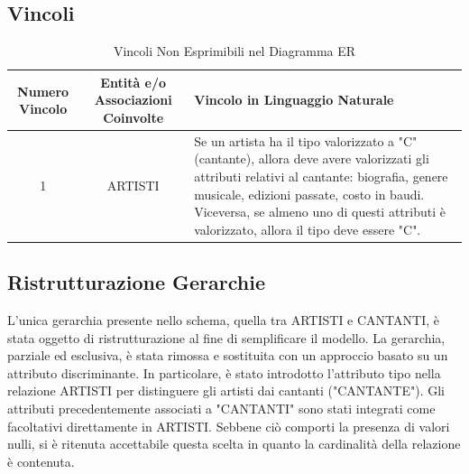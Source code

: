 \documentclass[a4paper,12pt]{article}
\begin{document}
\subsection{Vincoli}
\begin{table}[h!]
	\centering
	\begin{tabular}{|c|c|p{6.5cm}|}
		\hline
		\textbf{Numero Vincolo} & \textbf{Entità e/o Associazioni Coinvolte} & \textbf{Vincolo in Linguaggio Naturale} \\ \hline
		1 & ARTISTI & Se un artista ha il tipo valorizzato a "C" (cantante), allora deve avere valorizzati gli attributi relativi al cantante: biografia, genere musicale, edizioni passate, costo in baudi. Viceversa, se almeno uno di questi attributi è valorizzato, allora il tipo deve essere "C".\\ \hline
	\end{tabular}
	\caption{Vincoli Non Esprimibili nel Diagramma ER}
\end{table}

\subsection{Ristrutturazione Gerarchie}
L’unica gerarchia presente nello schema, quella tra ARTISTI e CANTANTI, è stata oggetto di ristrutturazione al fine di semplificare il modello. La gerarchia, parziale ed esclusiva, è stata rimossa e sostituita con un approccio basato su un attributo discriminante. In particolare, è stato introdotto l’attributo tipo nella relazione ARTISTI per distinguere gli artisti dai cantanti ("CANTANTE"). Gli attributi precedentemente associati a "CANTANTI" sono stati integrati come facoltativi direttamente in ARTISTI. Sebbene ciò comporti la presenza di valori nulli, si è ritenuta accettabile questa scelta in quanto la cardinalità della relazione è contenuta.
\end{document}
